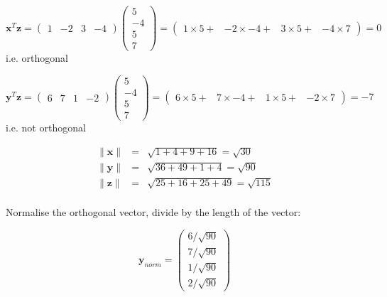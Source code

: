 \documentclass{article}
\begin{document}
\begin{enumerate}
\begin{displaymath}
\boldsymbol{x}^{T}\boldsymbol{z} = \left( \begin{array}{rrrr}1 & -2 & 3 & -4 \end{array} \right) \left( \begin{array}{r} 5 \\ -4 \\ 5 \\ 7 \end{array} \right) = \left( \begin{array}{rrrr} 1 \times 5 + & -2 \times -4 + & 3 \times 5 + & -4 \times 7 \end{array} \right) = 0
\end{displaymath}
i.e. orthogonal

\begin{displaymath}
\boldsymbol{y}^{T}\boldsymbol{z} = \left( \begin{array}{rrrr}6 & 7 & 1 & -2 \end{array} \right) \left( \begin{array}{r} 5 \\ -4 \\ 5 \\ 7 \end{array} \right) = \left( \begin{array}{rrrr} 6 \times 5 + & 7 \times -4 + & 1 \times 5 + & -2 \times 7 \end{array} \right) = -7
\end{displaymath}
i.e. not orthogonal


\begin{eqnarray*}
\lVert \boldsymbol{x} \rVert &=& \sqrt{1 + 4 + 9 + 16} = \sqrt{30} \\
\lVert \boldsymbol{y} \rVert &=& \sqrt{36 + 49 + 1 + 4} = \sqrt{90}\\
\lVert \boldsymbol{z} \rVert &=& \sqrt{25 + 16 + 25 + 49} = \sqrt{115} \\
\end{eqnarray*}

Normalise the orthogonal vector, divide by the length of the vector:

\begin{displaymath}
\boldsymbol{y}_{norm} = \left( \begin{array}{r} 6/\sqrt{90} \\7/\sqrt{90} \\ 1/\sqrt{90} \\ 2/\sqrt{90} \end{array} \right)
\end{displaymath}



\end{enumerate}
\end{document}
